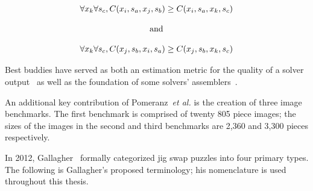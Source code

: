\begin{equation} \label{eq:pomeranzBestBuddyDefinition}
\centering
\begin{split}
	\begin{matrix}
		\forall{x_{k}}\forall{s_c},C(x_i, s_a, x_j, s_b) \geq C(x_i, s_a, x_k, s_c)
		\\
		\\
		\textnormal{and}
		\\
		\\
		\forall{x_{k}}\forall{s_c},C(x_j, s_b, x_i, s_a) \geq C(x_j, s_b, x_k, s_c)
	\end{matrix}
\end{split}
\end{equation} 


Best buddies have served as both an estimation metric for the quality of a solver output~\cite{sholomon2013} as well as the foundation of some solvers' assemblers~\cite{paikin2015}.

An additional key contribution of Pomeranz~\textit{et al.} is the creation of three image benchmarks.  The first benchmark is comprised of twenty 805 piece images; the sizes of the images in the second and third benchmarks are 2,360 and 3,300 pieces respectively.

In 2012, Gallagher~\cite{gallagher2012} formally categorized jig swap puzzles into four primary types.  The following is Gallagher's proposed terminology; his nomenclature is used throughout this thesis.

